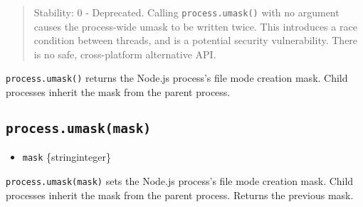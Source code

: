 \begin{quote}
Stability: 0 - Deprecated. Calling \texttt{process.umask()} with no
argument causes the process-wide umask to be written twice. This
introduces a race condition between threads, and is a potential security
vulnerability. There is no safe, cross-platform alternative API.
\end{quote}

\texttt{process.umask()} returns the Node.js process's file mode
creation mask. Child processes inherit the mask from the parent process.

\subsection{\texorpdfstring{\texttt{process.umask(mask)}}{process.umask(mask)}}\label{process.umaskmask}

\begin{itemize}
\tightlist
\item
  \texttt{mask} \{string\textbar integer\}
\end{itemize}

\texttt{process.umask(mask)} sets the Node.js process's file mode
creation mask. Child processes inherit the mask from the parent process.
Returns the previous mask.

\begin{Shaded}
\begin{Highlighting}[]
 \OperatorTok{;}

\OperatorTok{=} \OperatorTok{;}
\OperatorTok{=} \OperatorTok{;}
\NormalTok{(}
  \SpecialCharTok{$\{}\NormalTok{(}\NormalTok{)}\SpecialCharTok{\}}\SpecialCharTok{$\{}\NormalTok{(}\NormalTok{)}\SpecialCharTok{\}}\VerbatimStringTok{\textasciigrave{}}\OperatorTok{,}
\NormalTok{)}\OperatorTok{;}
\end{Highlighting}
\end{Shaded}

